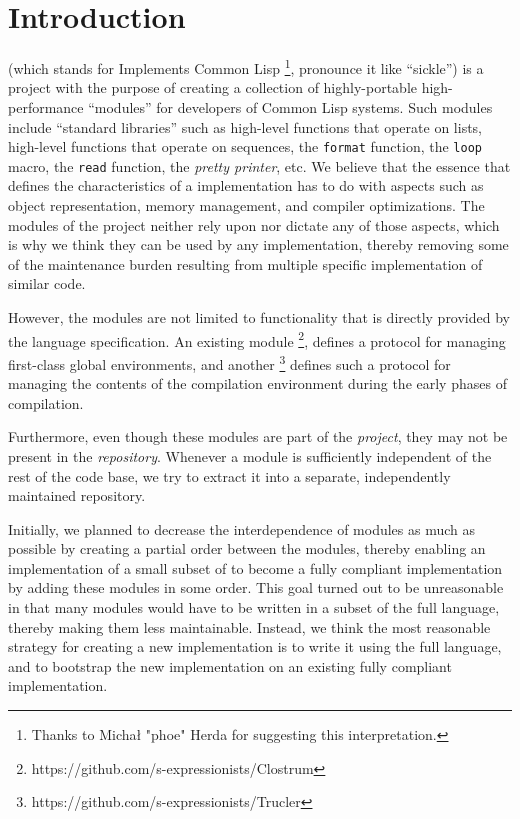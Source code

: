 
\chapter{Introduction}
%

\sysname{} (which stands for \sysname{} Implements Common Lisp%
\footnote{Thanks to Michał "phoe" Herda for suggesting this
  interpretation.}, pronounce it like ``sickle'') is a project with
the purpose of creating a collection of highly-portable
high-performance ``modules'' for developers of Common Lisp systems.
Such modules include ``standard libraries'' such as high-level
functions that operate on lists, high-level functions that operate on
sequences, the \texttt{format} function, the \texttt{loop} macro, the
\texttt{read} function, the \emph{pretty printer}, etc.  We believe
that the essence that defines the characteristics of a \commonlisp{}
implementation has to do with aspects such as object representation,
memory management, and compiler optimizations.  The modules of the
\sysname{} project neither rely upon nor dictate any of those aspects,
which is why we think they can be used by any \commonlisp{}
implementation, thereby removing some of the maintenance burden
resulting from multiple specific implementation of similar code.

However, the modules are not limited to functionality that is directly
provided by the \commonlisp{} language specification.  An existing
module%
\footnote{https://github.com/s-expressionists/Clostrum},
defines a \clos{} protocol for managing first-class global
environments, and another%
\footnote{https://github.com/s-expressionists/Trucler}
defines such a protocol for managing
the contents of the compilation environment during the early phases of
compilation.

Furthermore, even though these modules are part of the \sysname{}
\emph{project}, they may not be present in the \sysname{}
\emph{repository}.  Whenever a module is sufficiently independent of
the rest of the \sysname{} code base, we try to extract it into a
separate, independently maintained repository.

Initially, we planned to decrease the interdependence of modules as
much as possible by creating a partial order between the modules,
thereby enabling an implementation of a small subset of \commonlisp{}
to become a fully compliant implementation by adding these modules in
some order.  This goal turned out to be unreasonable in that many
modules would have to be written in a subset of the full language,
thereby making them less maintainable.  Instead, we think the most
reasonable strategy for creating a new \commonlisp{} implementation is
to write it using the full language, and to bootstrap the new
implementation on an existing fully compliant implementation.

